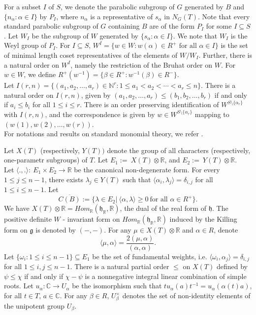 \documentclass[12pt,reqno]{amsart}
\numberwithin{equation}{section}
\theoremstyle{definition}
\begin{document}
For a subset $I$ of $S$, we denote the parabolic subgroup of $G$ generated by $B$ and $\{n_{\alpha}:\alpha\in I\}$ by $P_{I}$, where $n_{\alpha}$ is a representative of $s_{\alpha}$ in $N_{G}(T)$. Note that every standard parabolic subgroup of $G$ containing $B$ are of the form $P_{I}$ for some $I\subseteq S$. Let $W_{I}$ be the subgroup of $W$ generated by $\{s_{\alpha}:\alpha\in I\}$. We note that $W_{I}$ is the Weyl group of $P_{I}$. For $I\subseteq S$, $W^{I}=\{w\in W:w(\alpha)\in R^{+} \text{ for all }\alpha\in I\}$ is the set of minimal length coset representatives of the elements of $W/W_{I}$. Further, there is a natural order on $W^{I}$, namely the restriction of the Bruhat order on $W$. For $w\in W$, we define $R^{+}(w^{-1})=\{\beta\in R^{+}:w^{-1}(\beta)\in R^{-}\}$.\\
Let $I(r,n)=\{(a_{1},a_{2},\ldots,a_{r})\in\mathbb{N}^{r}:1\leq a_{1}<a_{2}<\cdots <a_{r}\leq n\}$. There is a natural order on $I(r,n)$, given by $(a_{1},a_{2},\ldots,a_{r})\leq (b_{1},b_{2},\ldots,b_{r})$ if and only if $a_{i}\leq b_{i}$ for all $1\leq i\leq r$. There is an order preserving identification of $W^{S\setminus\{\alpha_{r}\}}$ with $I(r,n)$, and the correspondence is given by $w\in W^{S\setminus\{\alpha_{r}\}}$ mapping to $(w(1),w(2),\ldots,w(r))$.\\
 For notations and results on standard monomial theory, we refer \cite{Seshadri}.
 
Let $X(T)$ (respectively, $Y(T))$ denote the group of all characters (respectively, one-parametr subgroups) of $T$. Let $E_{1}:=\ X(T)\otimes \mathbb{R}$, and $E_{2}:=\ Y(T)\otimes \mathbb{R}$.\\
 Let $\langle.,.\rangle :\ E_{1}\times E_{2}\longrightarrow\mathbb{R}$ be the canonical non-degenerate form. For every $1\leq j\leq n-1$, there exists $\lambda_{j}\in Y(T)$ such that $\langle\alpha_{i},\lambda_{j}\rangle=\delta_{i,j}$ for all $1\leq i\leq n-1$. Let \[\overline{C(B)}:=\{\lambda\in E_{2}|\ \langle \alpha,\lambda\rangle\geq0\ \text{for all\ }  \alpha\in R^{+}\}.\]	
We have $X(T)\otimes \mathbb{R}=Hom_{\mathbb{R}}(\mathfrak{h}_{\mathbb{R}},\mathbb{R})$, the dual of the real form of $\mathfrak{h}$. The positive definite $W$ - invariant form on $Hom_{\mathbb{R}}(\mathfrak{h}_{\mathbb{R}},\mathbb{R})$ induced by the Killing form on $\mathfrak{g}$ is denoted by $(-,-)$. For any $\mu\in X(T)\otimes\mathbb{R}$ and $\alpha\in R$, denote \[\langle \mu,\alpha\rangle=\frac{2(\mu,\alpha)}{(\alpha,\alpha)}.\]
 Let $\{\omega_{i}:1\leq i\leq n-1\}\subseteq E_{1}$ be the set of fundamental weights, i.e. $\langle\omega_{i},\alpha_{j}\rangle=\delta_{i,j}$ for all $1\leq i,j\leq n-1$.
There is a natural partial order $\le$ on $X(T)$ defined by $\psi\leq \chi$ if and only if $\chi-\psi$ is a nonnegative integral linear combination of simple roots.
Let $u_{\alpha}:\mathbb{C}\longrightarrow U_{\alpha}$ be the isomorphism such that $tu_{\alpha}(a)t^{-1}=u_{\alpha}(\alpha(t)a)$, for all $t\in T$, $a\in \mathbb{C}$. For any $\beta\in R$, $U_{\beta}^{\times}$ denotes the set of non-identity elements of the unipotent group $U_{\beta}$.
\end{document}
